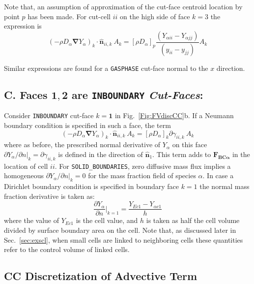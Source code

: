 %
Note that, an assumption of approximation of the cut-face centroid location by point $p$ has been made. For cut-cell $ii$ on the high side of face $k=3$ the expression is
%
\begin{equation}
  \left( - \rho D_\alpha \boldsymbol{\nabla} Y_\alpha \right)_k \cdot \hat{\mathbf{n}}_{ii,k} \: A_k =
  [ \rho D_\alpha ]_p \frac{\left(  Y_{\alpha ii} - Y_{\alpha jj} \right)}{(y_{ii}-y_{jj})}A_k
\end{equation}
%

Similar expressions are found for a \texttt{GASPHASE} cut-face normal to the $x$ direction. 


\subsection*{C. Faces $\mathbf{1},\mathbf{2}$ are \texttt{INBOUNDARY} \textit{Cut-Faces}:}

Consider \texttt{INBOUNDARY} cut-face $k=\mathbf{1}$ in Fig.~\ref{Fig:FVdiscCC}b. If a Neumann boundary condition is specified in such a face, the term
%
\begin{equation}
  \left( - \rho D_\alpha \boldsymbol{\nabla} Y_\alpha \right)_k \cdot \hat{\mathbf{n}}_{ii,k} \: A_k = [\rho D_\alpha]_k \partial \gamma_{ii,k} \: A_k
\end{equation}
%
where as before, the prescribed normal derivative of $Y_\alpha$ on this face $\partial Y_\alpha / \partial n |_k=\partial  \gamma_{ii,k}$ is defined in the direction of $\hat{\mathbf{n}}_1$.
This term adds to $\mathbf{F_{BC \alpha}}$ in the location of cell $ii$. For \texttt{SOLID\_BOUNDARIES}, zero diffusive mass flux implies a homogeneous $\partial Y_\alpha / \partial n |_k=0$ for the mass fraction field of species $\alpha$.
In case a Dirichlet boundary condition is specified in boundary face $k=1$ the normal mass fraction derivative is taken as:
%
\begin{equation}
   \frac{\partial Y_\alpha}{\partial n} |_{k=1}=\frac{Y_{Ec1} - Y_{\alpha c1}}{h} 
\end{equation}
%
where the value of $Y_{Ec1}$ is the cell value, and $h$ is taken as half the cell volume divided by surface boundary area on the cell. Note that, as discussed later in Sec.~\ref{sec:exscl}, when small cells are linked to neighboring cells these quantities refer to the control volume of linked cells.


\subsection{CC Discretization of Advective Term}

